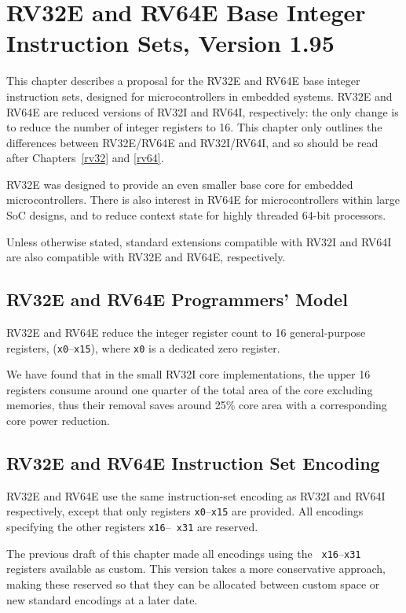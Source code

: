 \chapter{RV32E and RV64E Base Integer Instruction Sets, Version 1.95}
\label{rv32e}

This chapter describes a proposal for the RV32E and RV64E base integer
instruction sets, designed for microcontrollers in embedded systems.
RV32E and RV64E are reduced versions of RV32I and RV64I, respectively:
the only change is to reduce the number of integer registers to 16.
This chapter only outlines the differences between RV32E/RV64E and
RV32I/RV64I, and so should be read after Chapters~\ref{rv32} and
\ref{rv64}.

\begin{commentary}
RV32E was designed to provide an even smaller base core for embedded
microcontrollers.  There is also interest in RV64E for
microcontrollers within large SoC designs, and to reduce context state
for highly threaded 64-bit processors.

Unless otherwise stated, standard extensions compatible with RV32I
and RV64I are also compatible with RV32E and RV64E, respectively.
\end{commentary}

\section{RV32E and RV64E Programmers' Model}

RV32E and RV64E reduce the integer register count to 16
general-purpose registers, ({\tt x0}--{\tt x15}), where {\tt x0} is a
dedicated zero register.

\begin{commentary}
We have found that in the small RV32I core implementations, the upper
16 registers consume around one quarter of the total area of the core
excluding memories, thus their removal saves around 25\% core area
with a corresponding core power reduction.
\end{commentary}

\section{RV32E and RV64E Instruction Set Encoding}

RV32E and RV64E use the same instruction-set encoding as RV32I and
RV64I respectively, except that only registers {\tt x0}--{\tt x15} are
provided.  All encodings specifying the other registers {\tt x16}--{\tt
  x31} are reserved.

\begin{commentary}
The previous draft of this chapter made all encodings using the {\tt
  x16}--{\tt x31} registers available as custom.  This version takes a
more conservative approach, making these reserved so that they can be
allocated between custom space or new standard encodings at a later
date.
\end{commentary}
